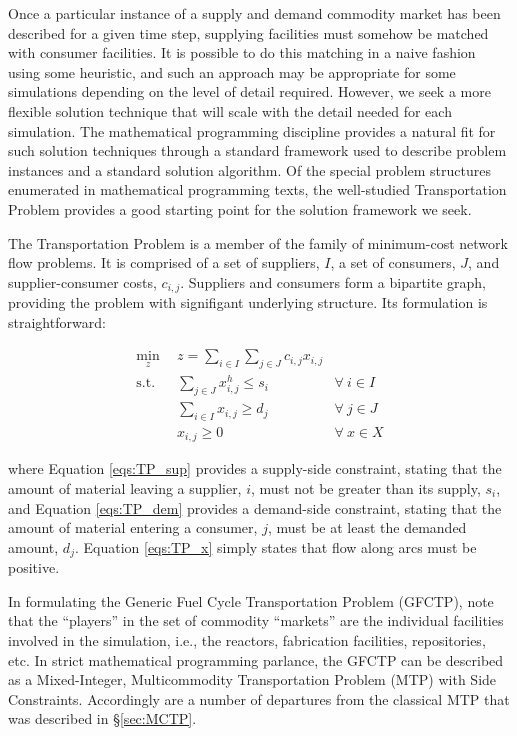 Once a particular instance of a supply and demand commodity market has been
described for a given time step, supplying facilities must somehow be matched
with consumer facilities. It is possible to do this matching in a naive fashion
using some heuristic, and such an approach may be appropriate for some
simulations depending on the level of detail required. However, we seek a more
flexible solution technique that will scale with the detail needed for each
simulation. The mathematical programming discipline provides a natural fit for
such solution techniques through a standard framework used to describe problem
instances and a standard solution algorithm. Of the special problem structures
enumerated in mathematical programming texts, the well-studied Transportation
Problem provides a good starting point for the solution framework we seek.

The Transportation Problem is a member of the family of minimum-cost network
flow problems. It is comprised of a set of suppliers, $I$, a set of consumers,
$J$, and supplier-consumer costs, $c_{i,j}$. Suppliers and consumers form a
bipartite graph, providing the problem with signifigant underlying
structure. Its formulation is straightforward:

\begin{subequations}\label{eqs:TP}
  \begin{align}
    \min_{z} \:\: & 
    z = \sum_{i \in I}\sum_{j \in J} c_{i,j} x_{i,j} 
    & \label{eqs:TP_obj} \\
    \text{s.t.} \:\: &
    \sum_{j \in J} x_{i,j}^{h} \leq s_{i} 
    &
    \forall \: i \in I \label{eqs:TP_sup} \\
    &
    \sum_{i \in I} x_{i,j} \geq d_{j} 
    & 
    \forall \: j \in J \label{eqs:TP_dem} \\
    &
    x_{i,j} \geq 0
    &
    \forall \: x \in X \label{eqs:TP_x}
  \end{align}
\end{subequations}

where Equation \ref{eqs:TP_sup} provides a supply-side constraint, stating that
the amount of material leaving a supplier, $i$, must not be greater than its
supply, $s_i$, and Equation \ref{eqs:TP_dem} provides a demand-side constraint,
stating that the amount of material entering a consumer, $j$, must be at least
the demanded amount, $d_j$. Equation \ref{eqs:TP_x} simply states that flow
along arcs must be positive.

In formulating the Generic Fuel Cycle Transportation Problem (GFCTP), note that
the ``players'' in the set of commodity ``markets'' are the individual
facilities involved in the simulation, i.e., the reactors, fabrication
facilities, repositories, etc. In strict mathematical programming parlance, the
GFCTP can be described as a Mixed-Integer, Multicommodity Transportation Problem
(MTP) with Side Constraints. Accordingly are a number of departures from the
classical MTP that was described in \S\ref{sec:MCTP}.


